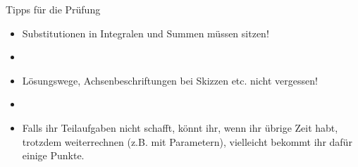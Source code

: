 \documentclass[14pt, aspectratio=169, handout]{beamer}
\begin{document}
\begin{frame}{Tipps für die Prüfung}
    \begin{itemize}
        \item Substitutionen in Integralen und Summen müssen sitzen!
        \item[] 
        \item Lösungswege, Achsenbeschriftungen bei Skizzen etc. nicht vergessen!
        \item[] 
        \item Falls ihr Teilaufgaben nicht schafft, könnt ihr, wenn ihr übrige Zeit habt, trotzdem weiterrechnen (z.B. mit Parametern), vielleicht bekommt ihr dafür einige Punkte.
    \end{itemize}
\end{frame}
\end{document}
